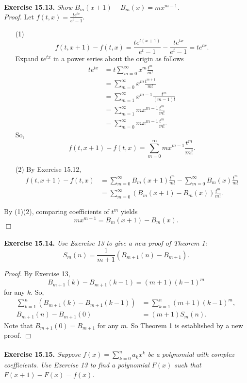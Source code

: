 \documentclass{article}
\begin{document}
\textbf{Exercise 15.13.}
\emph{Show $B_m(x+1) - B_m(x) = mx^{m-1}$.} \\

\emph{Proof.}
Let $f(t, x) = \frac{te^{tx}}{e^t - 1}$.
\begin{enumerate}
\item[(1)]
$$f(t, x+1) - f(t, x)
= \frac{te^{t(x+1)}}{e^t - 1} - \frac{te^{tx}}{e^t - 1}
= te^{tx}.$$
Expand $te^{tx}$ in a power series about the origin as follows
\begin{align*}
te^{tx}
&= t \sum_{m=0}^{\infty} x^m \frac{t^m}{m!} \\
&= \sum_{m=0}^{\infty} x^m \frac{t^{m+1}}{m!} \\
&= \sum_{m=1}^{\infty} x^{m-1} \frac{t^m}{(m-1)!} \\
&= \sum_{m=1}^{\infty} mx^{m-1} \frac{t^m}{m!} \\
&= \sum_{m=0}^{\infty} mx^{m-1} \frac{t^m}{m!}.
\end{align*}
So,
$$f(t, x+1) - f(t, x) = \sum_{m=0}^{\infty} mx^{m-1} \frac{t^m}{m!}.$$
\item[(2)]
By Exercise 15.12,
\begin{align*}
f(t, x+1) - f(t, x)
&= \sum_{m=0}^{\infty} B_m(x+1) \frac{t^m}{m!}
- \sum_{m=0}^{\infty} B_m(x) \frac{t^m}{m!} \\
&= \sum_{m=0}^{\infty} (B_m(x+1) - B_m(x)) \frac{t^m}{m!}.
\end{align*}
\end{enumerate}
By (1)(2), comparing coefficients of $t^m$ yields
$$mx^{m-1} = B_m(x+1) - B_m(x).$$
$\Box$ \\\\



\textbf{Exercise 15.14.}
\emph{Use Exercise 13 to give a new proof of Theorem 1:
$$S_m(n) = \frac{1}{m+1}(B_{m+1}(n) - B_{m+1}).$$}

\emph{Proof.}
By Exercise 13,
$$B_{m+1}(k) - B_{m+1}(k-1) = (m+1)(k-1)^m$$
for any $k$.
So,
\begin{align*}
\sum_{k=1}^{n} (B_{m+1}(k) - B_{m+1}(k-1))
&= \sum_{k=1}^{n} (m+1)(k-1)^m, \\
B_{m+1}(n) - B_{m+1}(0)
&= (m+1)S_m(n).
\end{align*}
Note that $B_{m+1}(0) = B_{m+1}$ for any $m$.
So Theorem 1 is established by a new proof.
$\Box$ \\\\


\textbf{Exercise 15.15.}
\emph{Suppose $f(x) = \sum_{k=0}^{n} a_k x^k$
be a polynomial with complex coefficients.
Use Exercise 13 to find a polynomial $F(x)$ such that
$F(x+1) - F(x) = f(x)$.} \\
\end{document}
